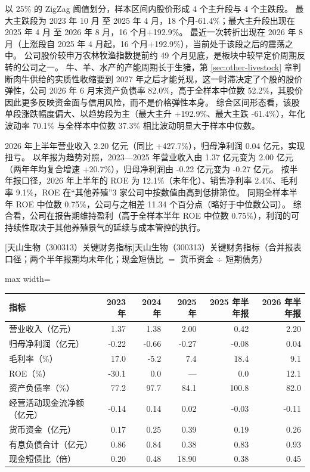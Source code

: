  以 25\% 的 ZigZag 阈值划分，样本区间内股价形成 4 个主升段与 4 个主跌段。 最大主跌段为 2023 年 10 月 至 2025 年 4 月，18 个月-61.4\%；最大主升段出现在 2025 年 4 月 至 2026 年 8 月，16 个月+192.9\%。 最近一次转折出现在 2026 年 8 月（上涨段自 2025 年 4 月起，16 个月+192.9\%），当前处于该段之后的震荡之中。 公司股价较申万农林牧渔指数提前约 49 个月见底，是板块中较早定价周期反转的公司之一。 牛、羊、水产的产能周期长于生猪，第 \ref{sec:other-livestock} 章判断肉牛供给的实质性收缩要到 2027 年之后才能兑现，这一时滞决定了个股的股价弹性，公司 2026 年 6 月末资产负债率 82.0\%，高于全样本中位数 52.2\%，其股价因此更多反映资金面与信用风险，而不是价格弹性本身。 综合区间形态看，该股单段涨跌幅度偏大、以趋势段为主（最大主升 +192.9\%、最大主跌 -61.4\%），年化波动率 70.1\% 与全样本中位数 37.3\% 相比波动明显大于样本中位数。

 2026 年上半年营业收入 2.20 亿元（同比 +427.7\%），归母净利润 0.04 亿元，实现扭亏。 以年报为趋势对照，2023---2025 年营业收入由 1.37 亿元变为 2.00 亿元（两年年均复合增速 +20.7\%），归母净利润由 -0.22 亿元变为 -0.27 亿元。 按半年报口径，2026 年上半年的 ROE 为 12.1\%（未年化）、销售净利率 2.4\%、毛利率 9.1\%，ROE 在“其他养殖”3 家公司中按数值由高到低排第位。 同期全样本半年 ROE 中位数 0.75\%，公司与之相差 11.34 个百分点（略好于中位数公司）。 综合看，公司在报告期维持盈利（高于全样本半年 ROE 中位数 0.75\%），利润的可持续性取决于其他养殖景气的延续与成本管控的执行。

\begin{center}\small\setlength{\tabcolsep}{3.4pt}
[天山生物（300313）关键财务指标]{天山生物（300313）关键财务指标（合并报表口径；两个半年报期均未年化；现金短债比 $=$ 货币资金 $\div$ 短期债务）}
\begin{adjustbox}{max width=\textwidth}
\begin{tabular}{@{}lrrrrr@{}}
\toprule
指标 & 2023 年 & 2024 年 & 2025 年 & 2025 年半年报 & 2026 年半年报 \\
\midrule
营业收入（亿元） & 1.37 & 1.38 & 2.00 & 0.42 & 2.20 \\
归母净利润（亿元） & -0.22 & -0.66 & -0.27 & -0.08 & 0.04 \\
毛利率（\%） & 17.0 & -5.2 & 7.4 & 18.4 & 9.1 \\
ROE（\%） & -30.1 & 0.0 & --- & 0.0 & 12.1 \\
资产负债率（\%） & 77.2 & 97.7 & 84.1 & 100.8 & 82.0 \\
经营活动现金流净额（亿元） & -0.14 & 0.14 & 0.02 & -0.03 & -0.11 \\
货币资金（亿元） & 0.17 & 0.25 & 0.39 & 0.19 & 0.26 \\
有息负债合计（亿元） & 0.86 & 0.84 & 0.38 & 0.83 & 0.93 \\
现金短债比（倍） & 0.20 & 0.48 & 18.90 & 0.38 & 0.45 \\
\bottomrule
\end{tabular}
\end{adjustbox}
\end{center}

